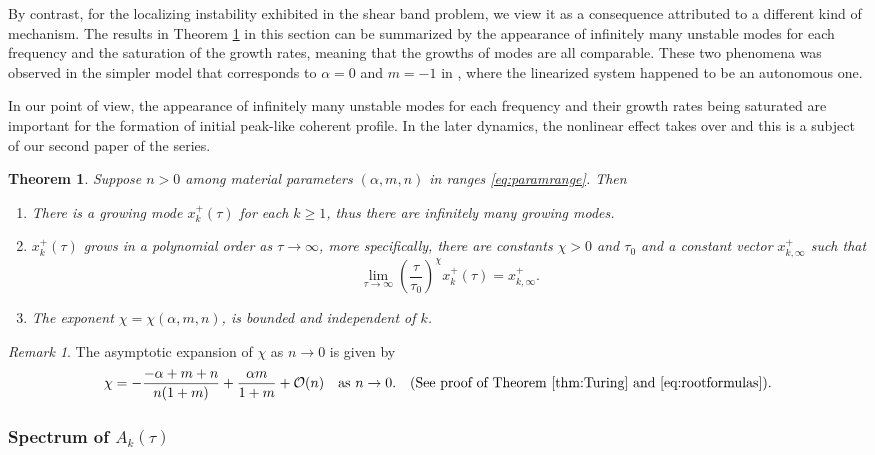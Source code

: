 \documentclass[a4paper,11pt]{article}
\newtheorem{theorem}{Theorem}
\theoremstyle{remark}
\newtheorem{remark}{Remark}[section]
\begin{document}
By contrast, for the localizing instability exhibited in the shear band problem, we view it as a consequence attributed to a different kind of mechanism. The results in Theorem \ref{thm:Turing} in this section can be summarized by the appearance of infinitely many unstable modes for each frequency and the saturation of the growth rates, meaning that the growths of modes are all comparable. These two phenomena was observed in the simpler model that corresponds to $\alpha=0$ and $m=-1$ in \cite{KLT16}, where the linearized system happened to be an autonomous one.

In our point of view, the appearance of infinitely many unstable modes for each frequency and their growth rates being saturated are important for the formation of initial peak-like coherent profile. In the later dynamics, the nonlinear effect takes over and this is a subject of our second paper of the series.

\begin{theorem} \label{thm:Turing} Suppose $n>0$ among material parameters $(\alpha,m,n)$ in ranges \eqref{eq:paramrange}. Then
  \begin{enumerate}
    \item There is a growing mode $x_k^+(\tau)$ for each $k\ge1$, thus there are  infinitely many growing modes.
    \item $x_k^+(\tau)$ grows in a polynomial order as $\tau \rightarrow \infty$, more specifically, there are constants $\chi>0$ and $\tau_0$ and a constant vector $x_{k,\infty}^+$ such that
    \begin{equation}
      \lim_{\tau \rightarrow \infty} \left(\frac{\tau}{\tau_0}\right)^{\chi} x_k^+(\tau) = x_{k,\infty}^+.
    \end{equation}
    \item The exponent $\chi=\chi(\alpha,m,n)$, is bounded and independent of $k$.
  \end{enumerate}
\end{theorem}
\begin{remark}
 The asymptotic expansion of $\chi$ as $n \rightarrow 0$ is given by
\begin{align*}
 \chi = -\frac{-\alpha+m+n}{n(1+m)} + \frac{\alpha m}{1+m} + \mathcal{O}(n) \quad \text{as } n \rightarrow 0. \quad \text{(See proof of Theorem \ref{thm:Turing} and \eqref{eq:rootformulas})}.%
\end{align*}
\end{remark}
\subsubsection{Spectrum of $A_k(\tau)$}
\end{document}
